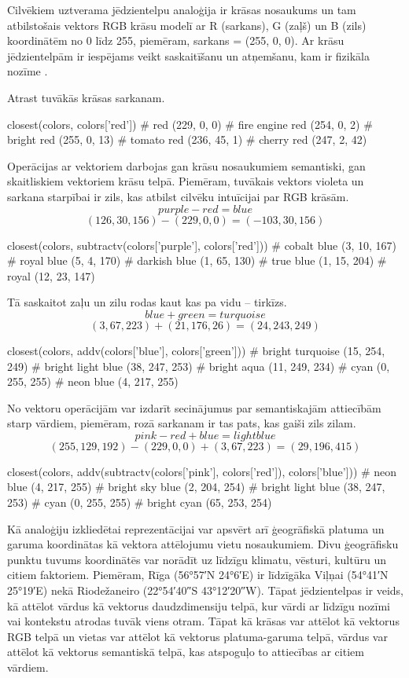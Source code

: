 Cilvēkiem uztverama jēdzientelpu analoģija ir krāsas nosaukums un tam atbilstošais vektors RGB krāsu modelī ar R (sarkans), G (zaļš) un B (zils) koordinātēm no 0 līdz 255, piemēram, sarkans = (255, 0, 0). Ar krāsu jēdzientelpām ir iespējams veikt saskaitīšanu un atņemšanu, kam ir fizikāla nozīme \cite{parrish2017}.

Atrast tuvākās krāsas sarkanam.
\begin{python}
closest(colors, colors['red'])
# red (229, 0, 0)
# fire engine red (254, 0, 2)
# bright red (255, 0, 13)
# tomato red (236, 45, 1)
# cherry red (247, 2, 42)
\end{python}

Operācijas ar vektoriem darbojas gan krāsu nosaukumiem semantiski, gan skaitliskiem vektoriem krāsu telpā. Piemēram, tuvākais vektors violeta un sarkana starpībai ir zils, kas atbilst cilvēku intuīcijai par RGB krāsām.
$$purple - red = blue$$
$$(126, 30, 156) - (229, 0, 0) = (-103, 30, 156)$$
\begin{python}
closest(colors, subtractv(colors['purple'], colors['red']))
# cobalt blue (3, 10, 167)
# royal blue (5, 4, 170)
# darkish blue (1, 65, 130)
# true blue (1, 15, 204)
# royal (12, 23, 147)
\end{python}

Tā saskaitot zaļu un zilu rodas kaut kas pa vidu -- tirkīzs.
$$blue + green = turquoise$$
$$(3, 67, 223) + (21, 176, 26) = (24, 243, 249)$$
\begin{python}
closest(colors, addv(colors['blue'], colors['green']))
# bright turquoise (15, 254, 249)
# bright light blue (38, 247, 253)
# bright aqua (11, 249, 234)
# cyan (0, 255, 255)
# neon blue (4, 217, 255)
\end{python}

No vektoru operācijām var izdarīt secinājumus par semantiskajām attiecībām starp vārdiem, piemēram, rozā sarkanam ir tas pats, kas gaiši zils zilam.
$$pink - red + blue = light blue$$
$$(255, 129, 192) - (229, 0, 0) + (3, 67, 223) = (29, 196, 415)$$
\begin{python}
closest(colors, addv(subtractv(colors['pink'], colors['red']), colors['blue']))
# neon blue (4, 217, 255)
# bright sky blue (2, 204, 254)
# bright light blue (38, 247, 253)
# cyan (0, 255, 255)
# bright cyan (65, 253, 254)
\end{python}

Kā analoģiju izkliedētai reprezentācijai var apsvērt arī ģeogrāfiskā platuma un garuma koordinātas kā vektora attēlojumu vietu nosaukumiem. Divu ģeogrāfisku punktu tuvums koordinātēs var norādīt uz līdzīgu klimatu, vēsturi, kultūru un citiem faktoriem. Piemēram, Rīga (56°57′N 24°6′E) ir līdzīgāka Viļņai (54°41′N 25°19′E) nekā Riodežaneiro (22°54′40″S 43°12′20″W). Tāpat jēdzientelpas ir veids, kā attēlot vārdus kā vektorus daudzdimensiju telpā, kur vārdi ar līdzīgu nozīmi vai kontekstu atrodas tuvāk viens otram. Tāpat kā krāsas var attēlot kā vektorus RGB telpā un vietas var attēlot kā vektorus platuma-garuma telpā, vārdus var attēlot kā vektorus semantiskā telpā, kas atspoguļo to attiecības ar citiem vārdiem.



